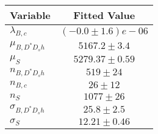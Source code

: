 \begin{tabular}[t]{lc}
\hline
Variable &Fitted Value\\
\hline\hline
$\lambda_{B,c}$&$(-0.0\pm1.6)e-06$\\
\hline
$\mu_{B, D^* D_s h}$&$5167.2\pm3.4$\\
\hline
$\mu_S$&$5279.37\pm0.59$\\
\hline
$n_{B, D^* D_s h}$&$519\pm24$\\
\hline
$n_{B,c}$&$26\pm12$\\
\hline
$n_S$&$1077\pm26$\\
\hline
$\sigma_{B, D^* D_s h}$&$25.8\pm2.5$\\
\hline
$\sigma_S$&$12.21\pm0.46$\\
\hline
\end{tabular}